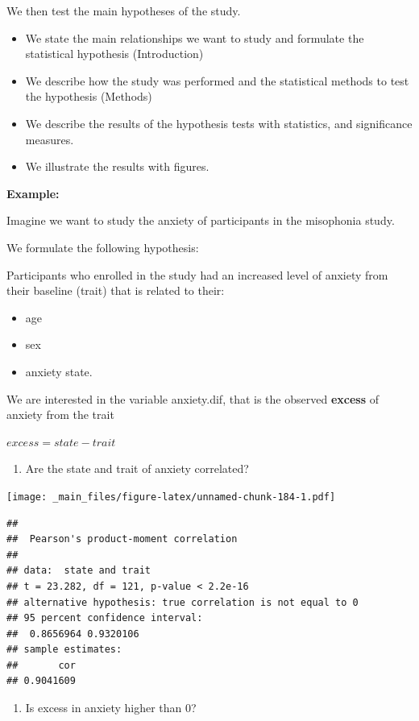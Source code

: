 \documentclass[
]{book}
\providecommand{\tightlist}{%
  \setlength{\itemsep}{0pt}\setlength{\parskip}{0pt}}
\begin{document}
We then test the main hypotheses of the study.

\begin{itemize}
\item
  We state the main relationships we want to study and formulate the statistical hypothesis (Introduction)
\item
  We describe how the study was performed and the statistical methods to test the hypothesis (Methods)
\item
  We describe the results of the hypothesis tests with statistics, and significance measures.
\item
  We illustrate the results with figures.
\end{itemize}

\textbf{Example:}

Imagine we want to study the anxiety of participants in the misophonia study.

We formulate the following hypothesis:

Participants who enrolled in the study had an increased level of anxiety from their baseline (trait) that is related to their:

\begin{itemize}
\tightlist
\item
  age
\item
  sex
\item
  anxiety state.
\end{itemize}

We are interested in the variable anxiety.dif, that is the observed \textbf{excess} of anxiety from the trait

\(excess = state - trait\)

\begin{enumerate}
\def\labelenumi{\arabic{enumi}.}
\tightlist
\item
  Are the state and trait of anxiety correlated?
\end{enumerate}

\texttt{[image: \_main\_files/figure-latex/unnamed-chunk-184-1.pdf]}

\begin{verbatim}
## 
##  Pearson's product-moment correlation
## 
## data:  state and trait
## t = 23.282, df = 121, p-value < 2.2e-16
## alternative hypothesis: true correlation is not equal to 0
## 95 percent confidence interval:
##  0.8656964 0.9320106
## sample estimates:
##       cor 
## 0.9041609
\end{verbatim}

\begin{enumerate}
\def\labelenumi{\arabic{enumi}.}
\setcounter{enumi}{1}
\tightlist
\item
  Is excess in anxiety higher than \(0\)?
\end{enumerate}
\end{document}
